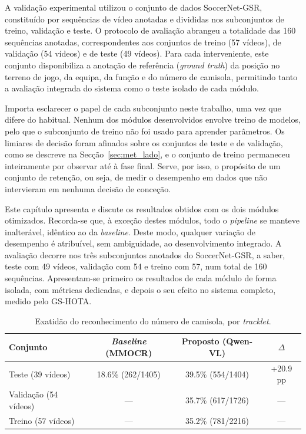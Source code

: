 A validação experimental utilizou o conjunto de dados SoccerNet-GSR, constituído por
sequências de vídeo anotadas e divididas nos subconjuntos de treino, validação e teste.
O protocolo de avaliação abrangeu a totalidade das 160 sequências anotadas,
correspondentes aos conjuntos de treino (57 vídeos), de validação (54 vídeos) e de teste
(49 vídeos). Para cada interveniente, este conjunto disponibiliza a anotação de
referência (\emph{ground truth}) da posição no terreno de jogo, da equipa, da função e do
número de camisola, permitindo tanto a avaliação integrada do sistema como o teste
isolado de cada módulo.

Importa esclarecer o papel de cada subconjunto neste trabalho, uma vez que difere do
habitual. Nenhum dos módulos desenvolvidos envolve treino de modelos, pelo que o
subconjunto de treino não foi usado para aprender parâmetros. Os limiares de decisão
foram afinados sobre os conjuntos de teste e de validação, como se descreve na
Secção~\ref{sec:met_lado}, e o conjunto de treino permaneceu inteiramente por observar
até à fase final. Serve, por isso, o propósito de um conjunto de retenção, ou seja, de
medir o desempenho em dados que não intervieram em nenhuma decisão de conceção.



Este capítulo apresenta e discute os resultados obtidos com os dois módulos otimizados.
Recorda-se que, à exceção destes módulos, todo o \emph{pipeline} se manteve inalterável,
idêntico ao da \emph{baseline}. Deste modo, qualquer variação de desempenho é atribuível,
sem ambiguidade, ao desenvolvimento integrado. A avaliação decorre nos três subconjuntos
anotados do SoccerNet-GSR, a saber, teste com 49 vídeos, validação com 54 e treino com
57, num total de 160 sequências. Apresentam-se primeiro os resultados de cada módulo de
forma isolada, com métricas dedicadas, e depois o seu efeito no sistema completo, medido
pelo GS-HOTA.



\begin{table}[htbp]
\centering
\caption{Exatidão do reconhecimento do número de camisola, por \emph{tracklet}.}
\label{tab:jnr}
\begin{tabular}{lccc}
\hline
\textbf{Conjunto} & \textit{\textbf{Baseline}} \textbf{(MMOCR)} & \textbf{Proposto (Qwen-VL)} & $\Delta$ \\
\hline
Teste (39 vídeos)      & 18.6\% (262/1405) & 39.5\% (554/1404) & +20.9 pp \\
Validação (54 vídeos)  & ---               & 35.7\% (617/1726) & --- \\
Treino (57 vídeos)     & ---               & 35.2\% (781/2216) & --- \\
\hline
\end{tabular}
\end{table}


